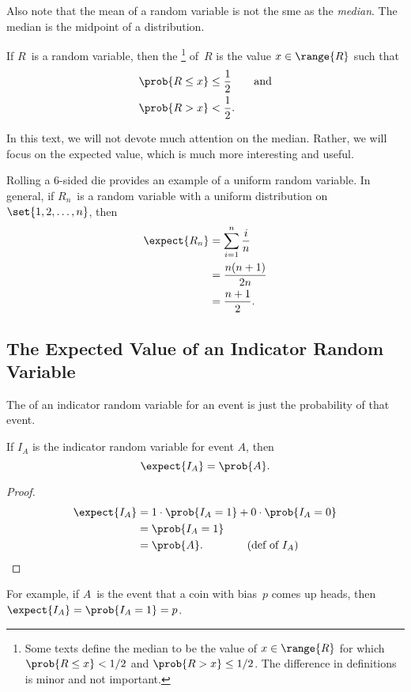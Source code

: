 Also note that the mean of a random variable is not the sme as the
\emph{median}.  The median is the midpoint of a distribution.

\begin{definition}\label{def:17A2}
If $R$~is a random variable, then the \footnote{Some
  texts define the median to be the value of $x \in \range{R}$ for
  which $\prob{R \le x} < 1/2$ and $\prob{R > x} \le 1/2$.  The
  difference in definitions is minor and not important.} of~$R$ is the
value $x \in \range{R}$ such that
\begin{align*}
    \prob{R \le x} & \le \frac{1}{2} \qquad \text{and} \\
    \prob{R > x}   & <    \frac{1}{2}.
\end{align*}
\end{definition}

In this text, we will not devote much attention on the median.
Rather, we will focus on the expected value, which is much more
interesting and useful.

Rolling a 6-sided die provides an example of a uniform random
variable.  In general, if $R_n$~is a random variable with a uniform
distribution on~$\set{1, 2, \dots, n}$, then
\begin{align*}
\expect{R_n}    &= \sum_{i = 1}^n \frac{i}{n} \\
                &= \frac{n (n + 1)}{2n} \\
                &= \frac{n + 1}{2}.
\end{align*}

\subsection{The Expected Value of an Indicator Random Variable}

The  of an  indicator random
variable for an event is just the probability of that event.  \iffalse
(Remember that a random variable $I_A$ is the indicator random variable
for event $A$, if $I_A = 1$ when $A$ occurs and $I_A= 0$ otherwise.)\fi

\begin{lemma}\label{expindic}
If $I_A$ is the indicator random variable for event $A$, then
\[
\expect{I_A} = \prob{A}.
\]
\end{lemma}

\begin{proof}
\begin{align*}
\expect{I_A}
& =  1 \cdot \prob{I_A = 1} + 0 \cdot \prob{I_A = 0} \\
& = \prob{I_A = 1} \\
& =  \prob{A}. \qquad\qquad \text{(def of $I_A$)}\qedhere
\end{align*}
\end{proof}
For example, if $A$~is the event that a coin with bias~$p$ comes up
heads, then $\expect{I_A} = \prob{I_A=1} = p$.

